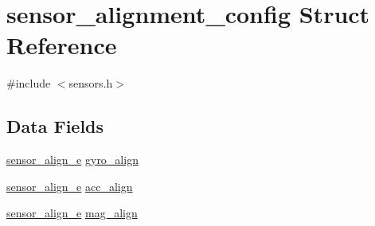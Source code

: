 \hypertarget{structsensor__alignment__config}{\section{sensor\+\_\+alignment\+\_\+config Struct Reference}
\label{structsensor__alignment__config}
}


{\ttfamily \#include $<$sensors.\+h$>$}

\subsection*{Data Fields}
\begin{DoxyCompactItemize}
\item 
\hyperlink{sensors_8h_a64e3c71d4562f54f6e168ac1f597dcf8}{sensor\+\_\+align\+\_\+e} \hyperlink{structsensor__alignment__config_a248b35033439d260cd4288c6c197bcfa}{gyro\+\_\+align}
\item 
\hyperlink{sensors_8h_a64e3c71d4562f54f6e168ac1f597dcf8}{sensor\+\_\+align\+\_\+e} \hyperlink{structsensor__alignment__config_a884336b1d398c12315581aa76aa1809d}{acc\+\_\+align}
\item 
\hyperlink{sensors_8h_a64e3c71d4562f54f6e168ac1f597dcf8}{sensor\+\_\+align\+\_\+e} \hyperlink{structsensor__alignment__config_a8226a01023de52da27af489e17a314b2}{mag\+\_\+align}
\end{DoxyCompactItemize}



